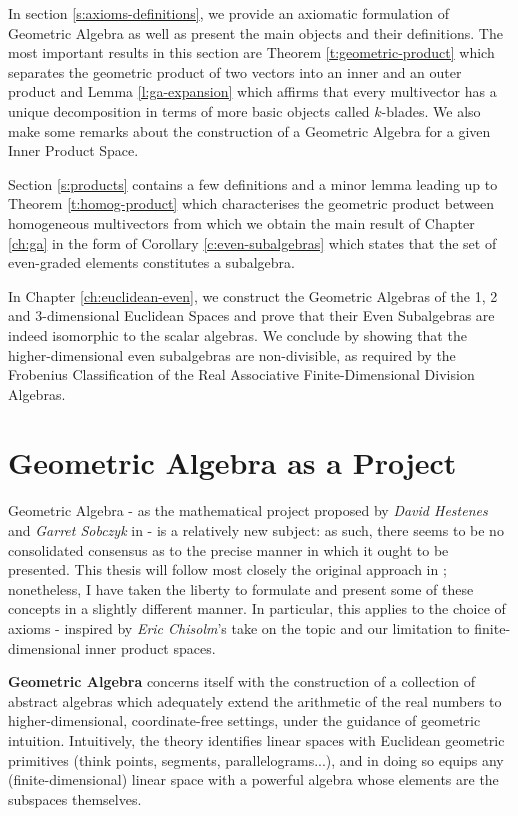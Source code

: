 In section \ref{s:axioms-definitions}, we provide an axiomatic formulation of Geometric Algebra as well as present the main objects and their definitions. The most important results in this section are Theorem \ref{t:geometric-product} which separates the geometric product of two vectors into an inner and an outer product and Lemma \ref{l:ga-expansion} which affirms that every multivector has a unique decomposition in terms of more basic objects called $k$-blades. We also make some remarks about the construction of a Geometric Algebra for a given Inner Product Space.

Section \ref{s:products} contains a few definitions and a minor lemma leading up to Theorem \ref{t:homog-product} which characterises the geometric product between homogeneous multivectors from which we obtain the main result of Chapter \ref{ch:ga} in the form of Corollary \ref{c:even-subalgebras} which states that the set of even-graded elements constitutes a subalgebra.

In Chapter \ref{ch:euclidean-even}, we construct the Geometric Algebras of the 1, 2 and 3-dimensional Euclidean Spaces and prove that their Even Subalgebras are indeed isomorphic to the scalar algebras. We conclude by showing that the higher-dimensional even subalgebras are non-divisible, as required by the Frobenius Classification of the Real Associative Finite-Dimensional Division Algebras.

\newpage

\section{Geometric Algebra as a Project}
Geometric Algebra - as the mathematical project proposed by \textit{David Hestenes} and \textit{Garret Sobczyk} in \cite{ga-origin} - is a relatively new subject: as such, there seems to be no consolidated consensus as to the precise manner in which it ought to be presented. This thesis will follow most closely the original approach in \cite{ga-origin}; nonetheless, I have taken the liberty to formulate and present some of these concepts in a slightly different manner. In particular, this applies to the choice of axioms - inspired by \textit{Eric Chisolm}'s take on the topic \cite{ga-chisolm} and our limitation to finite-dimensional inner product spaces.

\textbf{Geometric Algebra} concerns itself with the construction of a collection of abstract algebras which adequately extend the arithmetic of the real numbers to higher-dimensional, coordinate-free settings, under the guidance of geometric intuition. Intuitively, the theory identifies linear spaces with Euclidean geometric primitives (think points, segments, parallelograms...), and in doing so equips any (finite-dimensional) linear space with a powerful algebra whose elements are the subspaces themselves.

